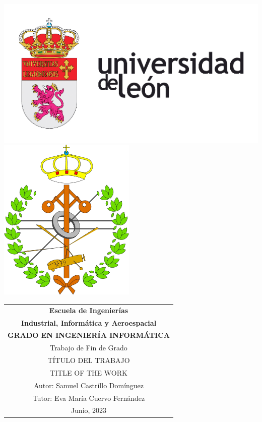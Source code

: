 \thispagestyle{empty}
\graphicspath{{./res/images/}}

\begin{table}[ht]
	\centering

	\hfill
	\\[-15ex]
	\includegraphics{imageULE}
	\hfill
	\includegraphics{imageInformatica}
	\\[16ex]

	\label{tab:coverTopCenter}
	\begin{tabular}{c}
		\LARGE\textbf{Escuela de Ingenierías}
		\\[1.5ex]

		\LARGE\textbf{Industrial, Informática y Aeroespacial}
		\\[2.3ex]

		\LARGE\textbf{GRADO EN INGENIERÍA INFORMÁTICA}
		\\[15ex]

		\LARGE{Trabajo de Fin de Grado}
		\\[15ex]

		\LARGE{\uppercase{Título del trabajo}}
		\\[5ex]

		\LARGE{\uppercase{Title of the work}}
		\\[30ex]

		\hfill\LARGE{Autor: Samuel Castrillo Domínguez}
		\\[6pt]
		\hfill\LARGE{Tutor: Eva María Cuervo Fernández}
		\\[20ex]

		\huge{Junio, 2023}
	\end{tabular}
\end{table}
